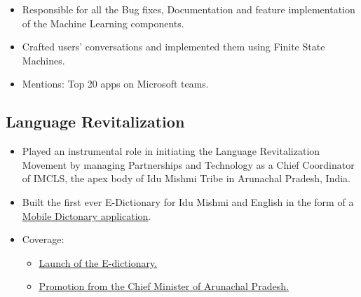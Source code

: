 \documentclass[11pt,a4paper,sans]{moderncv}
\begin{document}
\begin{itemize}
\begin{itemize}
    \item Responsible for all the Bug fixes, Documentation and feature implementation of the Machine Learning components.

    \item Crafted users’ conversations and implemented them using Finite State Machines.
    
    \item Mentions: Top 20 apps on Microsoft teams.

\end{itemize}

\vspace{6pt}

\end{itemize}



\subsection{Language Revitalization}

\item{}
    
    \begin{itemize}
    
    \item Played an instrumental role in initiating the Language Revitalization Movement by managing Partnerships and Technology as a Chief Coordinator of IMCLS, the apex body of Idu Mishmi Tribe in Arunachal Pradesh, India.

    \item Built the first ever E-Dictionary for Idu Mishmi and English in the form of a \underline{\href{https://play.google.com/store/apps/details?id=imcls.dictionary.demo_flutter}{ Mobile Dictonary application}}.
    
    \item Coverage: 
    
    \begin{itemize}
        \item \underline{\href{https://arunachaltimes.in/index.php/2020/12/14/imcls-launches-mishmi-idu-dictionary-app/}{Launch of the E-dictionary.}} 
        
        \item \underline{\href{https://m.facebook.com/story.php?story_fbid=4876201042454353&id=1037093553031807&sfnsn=wiwspwa}{Promotion from the Chief Minister of Arunachal Pradesh.}} 
        
    \end{itemize}
\end{itemize}
\end{document}
